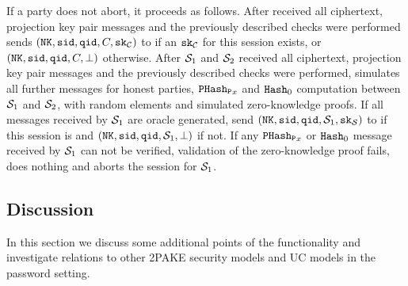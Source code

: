 \noindent              
        If a party does not abort, it proceeds as follows.
        After \Client received all ciphertext, projection key pair messages and the previously described checks were performed \SIM sends $(\mathtt{NK}, \mathtt{sid}, \mathtt{qid}, C, \mathtt{sk}_\mathcal{C})$ to \FTWOPAKE if an $\mathtt{sk}_\mathcal{C}$ for this session exists, or $(\mathtt{NK}, \mathtt{sid}, \mathtt{qid}, C, \bot)$ otherwise.
        After $\mathcal{S}_1$ and $\mathcal{S}_2$ received all ciphertext, projection key pair messages and the previously described checks were performed, \SIM simulates all further messages for honest parties, \ie $\mathtt{PHash_P}_x$ and $\mathtt{Hash}_0$ computation between $\mathcal{S}_1$ and $\mathcal{S}_2$, with random elements and simulated zero-knowledge proofs.
        If all messages received by $\mathcal{S}_1$ are oracle generated, send $(\mathtt{NK}, \mathtt{sid}, \mathtt{qid}, \mathcal{S}_1, \mathtt{sk}_\mathcal{S})$ to \FTWOPAKE if this session is \compromised and $(\mathtt{NK}, \mathtt{sid}, \mathtt{qid}, \mathcal{S}_1, \bot)$ if not.
        If any $\mathtt{PHash_P}_x$ or $\mathtt{Hash}_0$ message received by $\mathcal{S}_1$ can not be verified, \ie validation of the zero-knowledge proof fails, \SIM does nothing and aborts the session for $\mathcal{S}_1$.
        
        

\subsection{\FTWOPAKE Discussion}\label{sec:relations}
In this section we discuss some additional points of the \FTWOPAKE functionality and investigate relations to other \ac{2PAKE} security models and \ac{UC} models in the password setting.

